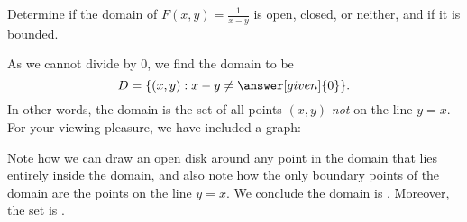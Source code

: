 \documentclass{ximera}
\begin{document}
\begin{example}
  Determine if the domain of $F(x,y) = \frac{1}{x-y}$ is open, closed,
  or neither, and if it is bounded.
  \begin{explanation}
    As we cannot divide by $0$, we find the domain to be
    \[
    D = \{(x,y):x-y\neq \answer[given]{0}\}.
    \]
    In other words, the domain is the set of all points $(x,y)$
    \textit{not} on the line $y=x$. For your viewing pleasure, we have
    included a graph:
    \begin{image}
    \end{image}
    Note how we can draw an open disk around any point in the domain
    that lies entirely inside the domain, and also note how the only
    boundary points of the domain are the points on the line $y=x$. We
    conclude the domain is . Moreover, the set is .
  \end{explanation}
\end{example}
\end{document}
